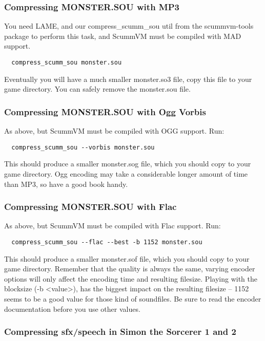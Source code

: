 \subsubsection{Compressing MONSTER.SOU with MP3}

You need LAME, and our compress\_scumm\_sou util from the scummvm-tools package
to perform this task, and ScummVM must be compiled with MAD support.
\begin{verbatim}
  compress_scumm_sou monster.sou
\end{verbatim}
%
Eventually you will have a much smaller monster.so3 file, copy this file
to your game directory. You can safely remove the monster.sou file.


\subsubsection{Compressing MONSTER.SOU with Ogg Vorbis}

As above, but ScummVM must be compiled with OGG support. Run:
\begin{verbatim}
  compress_scumm_sou --vorbis monster.sou
\end{verbatim}
%
This should produce a smaller monster.sog file, which you should copy to your
game directory. Ogg encoding may take a considerable longer amount of time
than MP3, so have a good book handy.


\subsubsection{Compressing MONSTER.SOU with Flac}

As above, but ScummVM must be compiled with Flac support. Run:
\begin{verbatim}
  compress_scumm_sou --flac --best -b 1152 monster.sou
\end{verbatim}
%
This should produce a smaller monster.sof file, which you should copy to your
game directory. Remember that the quality is always the same, varying encoder
options will only affect the encoding time and resulting  filesize. Playing
with the blocksize (-b <value>), has the biggest impact on the resulting
filesize -- 1152 seems to be a good value for those kind of soundfiles. Be sure
to read the encoder documentation before you use other values.


\subsubsection{Compressing sfx/speech in Simon the Sorcerer 1 and 2}

